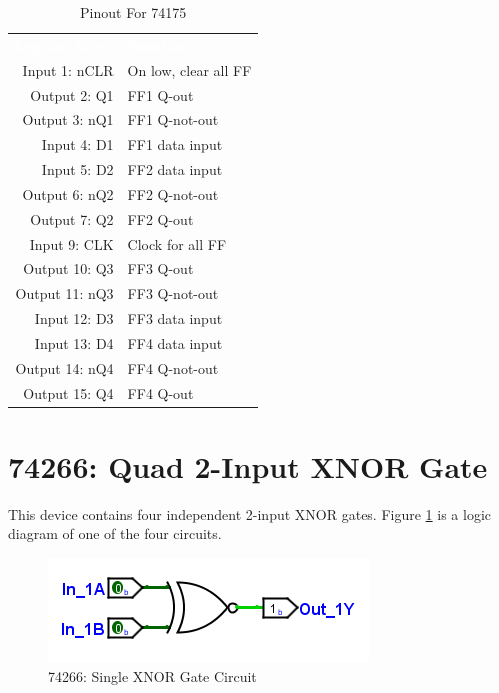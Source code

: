 \begin{table}[H]
	\sffamily
	\newcommand{\head}[1]{\textcolor{white}{\textbf{#1}}}		
	\begin{center}
		\begin{tabular}{rl} 
			\rowcolor{black!75}
			\head{Logisim Label} & \head{Function} \\
			Input 1: nCLR  & On low, clear all FF \\
			Output 2: Q1   & FF1 Q-out            \\
			Output 3: nQ1  & FF1 Q-not-out        \\
			Input 4: D1    & FF1 data input       \\
			Input 5: D2    & FF2 data input       \\
			Output 6: nQ2  & FF2 Q-not-out        \\
			Output 7: Q2   & FF2 Q-out            \\
			Input 9: CLK   & Clock for all FF     \\
			Output 10: Q3  & FF3 Q-out            \\
			Output 11: nQ3 & FF3 Q-not-out        \\
			Input 12: D3   & FF3 data input       \\
			Input 13: D4   & FF4 data input       \\
			Output 14: nQ4 & FF4 Q-not-out        \\
			Output 15: Q4  & FF4 Q-out            \\
		\end{tabular}
	\end{center}
	\caption{Pinout For 74175}
	\label{tab:50-74175}
\end{table}

\section{74266: Quad 2-Input XNOR Gate}

This device contains four independent 2-input XNOR gates. Figure \ref{fig:50-74266} is a logic diagram of one of the four circuits.

\begin{figure}[H]
	\centering
	\includegraphics{gfx/50-74266}
	\caption{74266: Single XNOR Gate Circuit}
	\label{fig:50-74266}
\end{figure}


